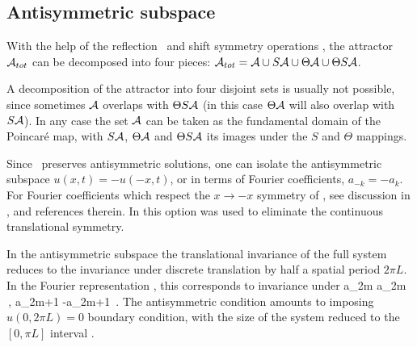 \subsection{Antisymmetric subspace}
\label{s:AntisymmSubsp}

With the help of the
reflection \Refl\ and shift symmetry {\Shift}
operations
,
the  attractor ${\cal A}_{tot}$ can be decomposed into four pieces:
 ${\cal A}_{tot}={\cal A} \cup S {\cal A}  \cup \Theta {\cal A}
  \cup \Theta S {\cal A} $.

A decomposition
of the attractor into four disjoint sets
is usually not possible, since sometimes $ {\cal A}$ overlaps with
$\Theta S{\cal A} $ (in this case $\Theta  {\cal A}$ will also  overlap with
$S {\cal A} $).
In any case  the set $ {\cal A}$ can be taken as
the fundamental
domain of the Poincar{\'e} map, with $S  {\cal A} $,
$\Theta  {\cal A} $ and $\Theta S  {\cal A} $ its images under the
$S$ and $\Theta$ mappings.



Since \KSe\ preserves
antisymmetric solutions, one can isolate the antisymmetric
subspace
$u(x,t)=-u(-x,t)$, or in terms of Fourier coefficients,
$a_{-k}= - a_k$.
For Fourier coefficients which respect the $x \to -x$ symmetry of
\KSe, see discussion in ,
and references therein.
In 
this option was used to eliminate
the continuous translational symmetry.

In the antisymmetric subspace the translational
invariance of the full system reduces
to the invariance under discrete
translation by half a spatial period $2\pi L$.
In the Fourier representation ,
this corresponds to invariance under
\beq
a_{2m} \to a_{2m}
    \,,\qquad
a_{2m+1} \to -a_{2m+1}
\,.
The antisymmetric condition amounts to imposing
$u(0,2\pi L)=0$ boundary condition, with
the size of the system reduced to
the $[0, \pi L]$ interval
.

